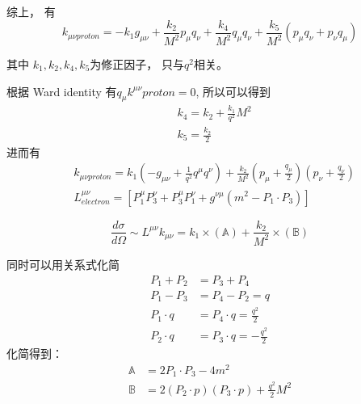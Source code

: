 \documentclass[slidestop, compress, red]{beamer}
\begin{document}
\begin{frame}
	综上， 有
	\begin{equation}
		k_{\mu\nu proton}= -k_1g_{\mu\nu} +\frac{k_2}{M^2}p_\mu q_\nu + \frac{k_4}{M^2} q_\mu q_\nu + \frac{k_5}{M^2}(p_\mu q_\nu+p_\nu q_\mu)
	\end{equation}

	其中 $k_1, k_2, k_4,k_5$为修正因子， 只与$q^2$相关。

	根据 Ward identity 有$q_\mu k^{\mu\nu}{proton} = 0$, 所以可以得到
	\begin{equation}
		\begin{split}
		&k_4=k_2+\frac{k_1}{q^2}M^2 \\
		&k_5=\frac{k_2}{2}
		\end{split}
	\end{equation}
	进而有
	\begin{equation}
	\begin{split}
	&k_{\mu\nu proton} = k_1(-g_{\mu\nu} + \frac{1}{q^2}q^\mu q^\nu) + \frac{k_2}{M^2}(p_\mu+\frac{q_\mu}{2})(p_\nu+\frac{q_\nu}{2}) \\
	&L^{\mu\nu}_{electron}=[P_1^\mu P_3^\nu+P_3^\mu P_1^\nu+g^{\nu\mu}(m^2-P_1\cdot P_3)]
	\end{split}
	\end{equation}
\end{frame}

\begin{frame}

\begin{equation}
	\frac{d\sigma}{d\Omega} \sim L^{\mu\nu}k_{\mu\nu} = k_1\times(\mathbb{A})+\frac{k_2}{M^2}\times(\mathbb{B})
\end{equation}

同时可以用关系式化简 
\[
\begin{split}
P_1+P_2&=P_3+P_4\\
P_1-P_3&=P_4-P_2=q\\
P_1\cdot q &= P_4 \cdot q = \frac{q^2}{2}\\
P_2\cdot q &= P_3 \cdot q = -\frac{q^2}{2}
\end{split}
\]
化简得到：
\begin{equation}
	\begin{split}
	\mathbb{A} &= 2P_1\cdot P_3 -4m^2\\
	\mathbb{B} &= 2(P_2\cdot p)(P_3 \cdot p) +\frac{q^2}{2}M^2
	\end{split}
\end{equation}
\end{frame}
\end{document}
